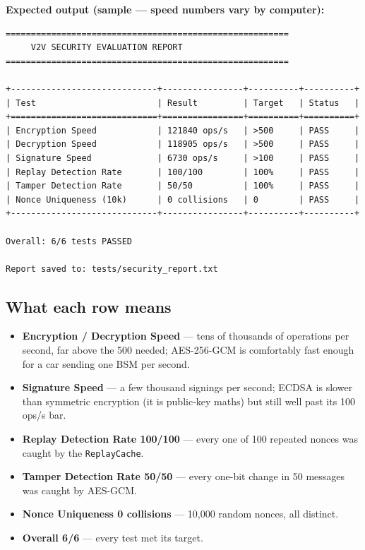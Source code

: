 \documentclass[11pt,a4paper]{article}
\begin{document}
\noindent\textbf{Expected output (sample --- speed numbers vary by computer):}
\begin{lstlisting}[style=term]
========================================================
     V2V SECURITY EVALUATION REPORT
========================================================

+-----------------------------+----------------+----------+----------+
| Test                        | Result         | Target   | Status   |
+=============================+================+==========+==========+
| Encryption Speed            | 121840 ops/s   | >500     | PASS     |
| Decryption Speed            | 118905 ops/s   | >500     | PASS     |
| Signature Speed             | 6730 ops/s     | >100     | PASS     |
| Replay Detection Rate       | 100/100        | 100%     | PASS     |
| Tamper Detection Rate       | 50/50          | 100%     | PASS     |
| Nonce Uniqueness (10k)      | 0 collisions   | 0        | PASS     |
+-----------------------------+----------------+----------+----------+

Overall: 6/6 tests PASSED

Report saved to: tests/security_report.txt
\end{lstlisting}

\subsection{What each row means}
\begin{itemize}
  \item \textbf{Encryption / Decryption Speed} --- tens of thousands of
        operations per second, far above the 500 needed; AES-256-GCM is
        comfortably fast enough for a car sending one BSM per second.
  \item \textbf{Signature Speed} --- a few thousand signings per second; ECDSA is
        slower than symmetric encryption (it is public-key maths) but still well
        past its 100 ops/s bar.
  \item \textbf{Replay Detection Rate 100/100} --- every one of 100 repeated
        nonces was caught by the \texttt{ReplayCache}.
  \item \textbf{Tamper Detection Rate 50/50} --- every one-bit change in 50
        messages was caught by AES-GCM.
  \item \textbf{Nonce Uniqueness 0 collisions} --- 10{,}000 random nonces, all
        distinct.
  \item \textbf{Overall 6/6} --- every test met its target.
\end{itemize}
\end{document}
